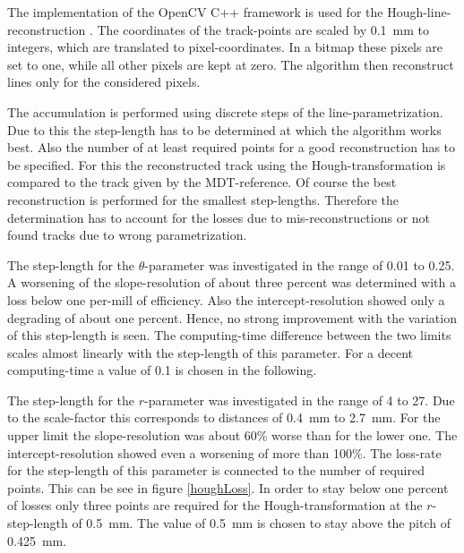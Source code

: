 \documentclass[
twoside,            %
BCOR1.4cm,          %
10pt,               %
headings=normal,    %
headsepline,        %
clearplainpage,		%
final,              %
div=14,
open=right,
bibliography=toc
]{scrreprt}
\begin{document}
The implementation of the OpenCV C++ framework is used for the Hough-line-reconstruction \cite{openCVlibrary}.
The coordinates of the track-points are scaled by \SI{0.1}{mm} to integers, which are translated to pixel-coordinates.
In a bitmap these pixels are set to one, while all other pixels are kept at zero.
The algorithm then reconstruct lines only for the considered pixels.

The accumulation is performed using discrete steps of the line-parametrization.
Due to this the step-length has to be determined at which the algorithm works best.
Also the number of at least required points for a good reconstruction has to be specified.
For this the reconstructed track using the Hough-transformation is compared to the track given by the MDT-reference.
Of course the best reconstruction is performed for the smallest step-lengths.
Therefore the determination has to account for the losses due to mis-reconstructions or not found tracks due to wrong parametrization.

The step-length for the $\theta$-parameter was investigated in the range of 0.01 to 0.25.
A worsening of the slope-resolution of about three percent was determined with a loss below one per-mill of efficiency.
Also the intercept-resolution showed only a degrading of about one percent.
Hence, no strong improvement with the variation of this step-length is seen.
The computing-time difference between the two limits scales almost linearly with the step-length of this parameter.
For a decent computing-time a value of 0.1 is chosen in the following.

The step-length for the $r$-parameter was investigated in the range of 4 to 27.
Due to the scale-factor this corresponds to distances of \SI{0.4}{mm} to \SI{2.7}{mm}.
For the upper limit the slope-resolution was about 60\% worse than for the lower one.
The intercept-resolution showed even a worsening of more than 100\%.
The loss-rate for the step-length of this parameter is connected to the number of required points.
This can be see in figure \ref{houghLoss}.
In order to stay below one percent of losses only three points are required for the Hough-transformation at the $r$-step-length of \SI{0.5}{mm}.
The value of \SI{0.5}{mm} is chosen to stay above the pitch of \SI{0.425}{mm}.
\end{document}
